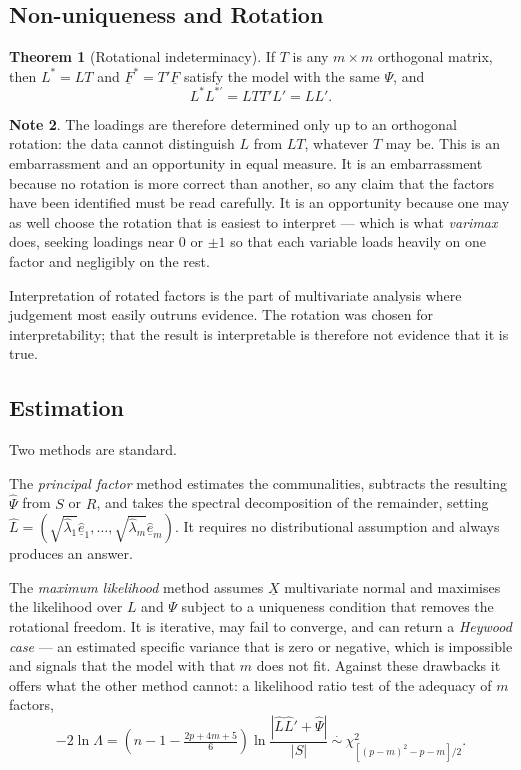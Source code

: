 \documentclass[11pt,a4paper]{article}
\theoremstyle{definition}
\newtheorem{thm}{Theorem}[section]
\newtheorem{note}[thm]{Note}
\begin{document}
\subsection{Non-uniqueness and Rotation}

\begin{thm}[Rotational indeterminacy]
\label{thm:rotation}
If $T$ is any $m\times m$ orthogonal matrix, then $L^{*}=LT$ and
$\underline{F}^{*}=T'\underline{F}$ satisfy the model with the same $\Psi$, and
$$L^{*}L^{*\prime} = LTT'L' = LL'.$$
\end{thm}

\begin{note}
The loadings are therefore determined only up to an orthogonal rotation: the
data cannot distinguish $L$ from $LT$, whatever $T$ may be. This is an
embarrassment and an opportunity in equal measure. It is an embarrassment
because no rotation is more correct than another, so any claim that the factors
have been identified must be read carefully. It is an opportunity because one
may as well choose the rotation that is easiest to interpret --- which is what
\emph{varimax} does, seeking loadings near $0$ or $\pm1$ so that each variable
loads heavily on one factor and negligibly on the rest.

Interpretation of rotated factors is the part of multivariate analysis where
judgement most easily outruns evidence. The rotation was chosen for
interpretability; that the result is interpretable is therefore not evidence
that it is true.
\end{note}

\subsection{Estimation}

Two methods are standard.

The \emph{principal factor} method estimates the communalities, subtracts the
resulting $\widehat{\Psi}$ from $S$ or $R$, and takes the spectral decomposition
of the remainder, setting
$\widehat{L} = \left(\sqrt{\widehat{\lambda}_1}\widehat{\underline{e}}_1,
\dots,\sqrt{\widehat{\lambda}_m}\widehat{\underline{e}}_m\right)$. It requires
no distributional assumption and always produces an answer.

The \emph{maximum likelihood} method assumes $\underline{X}$ multivariate normal
and maximises the likelihood over $L$ and $\Psi$ subject to a uniqueness
condition that removes the rotational freedom. It is iterative, may fail to
converge, and can return a \emph{Heywood case} --- an estimated specific
variance that is zero or negative, which is impossible and signals that the
model with that $m$ does not fit. Against these drawbacks it offers what the
other method cannot: a likelihood ratio test of the adequacy of $m$ factors,
$$-2\ln\Lambda = \left(n-1-\tfrac{2p+4m+5}{6}\right)
\ln\frac{\left|\widehat{L}\widehat{L}'+\widehat{\Psi}\right|}{\left|S\right|}
\ \overset{\cdot}{\sim}\ \chi^{2}_{\left[(p-m)^{2}-p-m\right]/2}.$$
\end{document}
